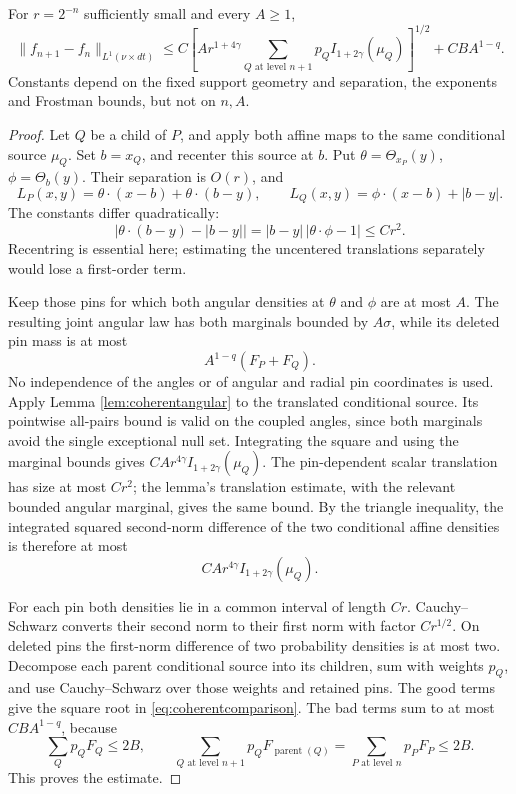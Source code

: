 \begin{proposition}\label{prop:coherentcomparison}
For \(r=2^{-n}\) sufficiently small and every \(A\geq1\),
\begin{equation}\label{eq:coherentcomparison}
\|f_{n+1}-f_n\|_{L^1(\nu\times dt)}
\leq C\left[
A r^{1+4\gamma}\sum_{Q\text{ at level }n+1}p_QI_{1+2\gamma}(\mu_Q)
\right]^{1/2}+CB A^{1-q}.
\end{equation}
Constants depend on the fixed support geometry and separation, the exponents and Frostman bounds, but not on \(n,A\).
\end{proposition}
\begin{proof}
Let \(Q\) be a child of \(P\), and apply both affine maps to the same conditional source \(\mu_Q\). Set \(b=x_Q\), and recenter this source at \(b\). Put \(\theta=\Theta_{x_P}(y)\), \(\phi=\Theta_b(y)\). Their separation is \(O(r)\), and
$$
L_P(x,y)=\theta\cdot(x-b)+\theta\cdot(b-y),\qquad
L_Q(x,y)=\phi\cdot(x-b)+|b-y|.
$$
The constants differ quadratically:
$$
|\theta\cdot(b-y)-|b-y||
=|b-y|\,|\theta\cdot\phi-1|\leq Cr^2.
$$
Recentring is essential here; estimating the uncentered translations separately would lose a first-order term.

Keep those pins for which both angular densities at \(\theta\) and \(\phi\) are at most \(A\). The resulting joint angular law has both marginals bounded by \(A\sigma\), while its deleted pin mass is at most
$$
A^{1-q}(F_P+F_Q).
$$
No independence of the angles or of angular and radial pin coordinates is used. Apply Lemma \ref{lem:coherentangular} to the translated conditional source. Its pointwise all-pairs bound is valid on the coupled angles, since both marginals avoid the single exceptional null set. Integrating the square and using the marginal bounds gives \(CA r^{4\gamma}I_{1+2\gamma}(\mu_Q)\). The pin-dependent scalar translation has size at most \(Cr^2\); the lemma's translation estimate, with the relevant bounded angular marginal, gives the same bound. By the triangle inequality, the integrated squared second-norm difference of the two conditional affine densities is therefore at most
$$
CA r^{4\gamma}I_{1+2\gamma}(\mu_Q).
$$

For each pin both densities lie in a common interval of length \(Cr\). Cauchy--Schwarz converts their second norm to their first norm with factor \(Cr^{1/2}\). On deleted pins the first-norm difference of two probability densities is at most two. Decompose each parent conditional source into its children, sum with weights \(p_Q\), and use Cauchy--Schwarz over those weights and retained pins. The good terms give the square root in \eqref{eq:coherentcomparison}. The bad terms sum to at most \(CB A^{1-q}\), because
$$
\sum_Qp_QF_Q\leq2B,\qquad
\sum_{Q\text{ at level }n+1}p_QF_{\operatorname{parent}(Q)}
=\sum_{P\text{ at level }n}p_PF_P\leq2B.
$$
This proves the estimate.
\end{proof}

